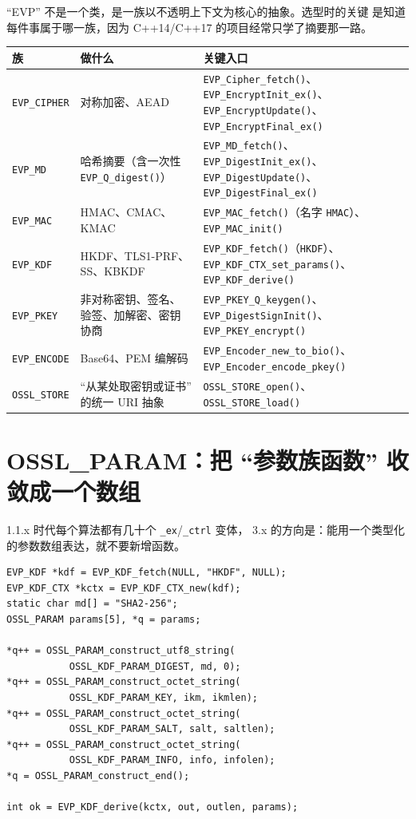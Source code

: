 \documentclass[12pt,a4paper,fontset=fandol]{ctexbook}
\newcommand{\cpp}[1]{C++#1}
\newcommand{\Fn}[1]{\texttt{#1()}}
\newcommand{\Tp}[1]{\texttt{#1}}
\begin{document}
``EVP'' 不是一个类，是一族以不透明上下文为核心的抽象。选型时的关键
是知道每件事属于哪一族，因为 \cpp{14}/\allowbreak{}\cpp{17} 的项目经常只学了摘要那一路。

\begin{footnotesize}
\begin{longtable}{@{}>{\raggedright\arraybackslash}p{}
                  >{\raggedright\arraybackslash}p{}
                  >{\raggedright\arraybackslash}p{}@{}}
\toprule
\textbf{族} & \textbf{做什么} & \textbf{关键入口} \\
\midrule
\Tp{EVP\_CIPHER} & 对称加密、AEAD &
\Fn{EVP\_Cipher\_fetch}、\Fn{EVP\_EncryptInit\_ex}、
\Fn{EVP\_EncryptUpdate}、\Fn{EVP\_EncryptFinal\_ex} \\
\addlinespace
\Tp{EVP\_MD} & 哈希摘要（含一次性 \Fn{EVP\_Q\_digest}） &
\Fn{EVP\_MD\_fetch}、\Fn{EVP\_DigestInit\_ex}、
\Fn{EVP\_DigestUpdate}、\Fn{EVP\_DigestFinal\_ex} \\
\addlinespace
\Tp{EVP\_MAC} & HMAC、CMAC、KMAC &
\Fn{EVP\_MAC\_fetch}（名字 \texttt{HMAC}）、\Fn{EVP\_MAC\_init} \\
\addlinespace
\Tp{EVP\_KDF} & HKDF、TLS1-PRF、SS、KBKDF &
\Fn{EVP\_KDF\_fetch}（\texttt{HKDF}）、\Fn{EVP\_KDF\_CTX\_set\_params}、
\Fn{EVP\_KDF\_derive} \\
\addlinespace
\Tp{EVP\_PKEY} & 非对称密钥、签名、验签、加解密、密钥协商 &
\Fn{EVP\_PKEY\_Q\_keygen}、\Fn{EVP\_DigestSignInit}、
\Fn{EVP\_PKEY\_encrypt} \\
\addlinespace
\Tp{EVP\_ENCODE} & Base64、PEM 编解码 &
\Fn{EVP\_Encoder\_new\_to\_bio}、\Fn{EVP\_Encoder\_encode\_pkey} \\
\addlinespace
\Tp{OSSL\_STORE} & ``从某处取密钥或证书'' 的统一 URI 抽象 &
\Fn{OSSL\_STORE\_open}、\Fn{OSSL\_STORE\_load} \\
\bottomrule
\end{longtable}
\end{footnotesize}

\section{OSSL\_PARAM：把 ``参数族函数'' 收敛成一个数组}

1.1.x 时代每个算法都有几十个 \texttt{\_ex}/\allowbreak{}\texttt{\_ctrl} 变体，
3.x 的方向是：能用一个类型化的参数数组表达，就不要新增函数。

\begin{lstlisting}[caption={HKDF 派生：参数数组风格}]
EVP_KDF *kdf = EVP_KDF_fetch(NULL, "HKDF", NULL);
EVP_KDF_CTX *kctx = EVP_KDF_CTX_new(kdf);
static char md[] = "SHA2-256";
OSSL_PARAM params[5], *q = params;

*q++ = OSSL_PARAM_construct_utf8_string(
           OSSL_KDF_PARAM_DIGEST, md, 0);
*q++ = OSSL_PARAM_construct_octet_string(
           OSSL_KDF_PARAM_KEY, ikm, ikmlen);
*q++ = OSSL_PARAM_construct_octet_string(
           OSSL_KDF_PARAM_SALT, salt, saltlen);
*q++ = OSSL_PARAM_construct_octet_string(
           OSSL_KDF_PARAM_INFO, info, infolen);
*q = OSSL_PARAM_construct_end();

int ok = EVP_KDF_derive(kctx, out, outlen, params);
\end{lstlisting}
\end{document}
